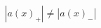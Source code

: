 \documentclass[preview]{standalone}
\begin{document}
\begin{align*}
|a(x)_+| \neq |a(x)_-|
\end{align*}
\end{document}
